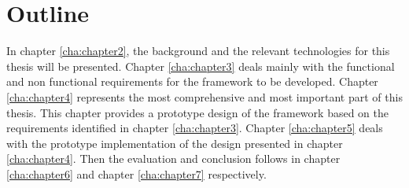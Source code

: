\section{Outline\label{sec:intro_out}}
In chapter \ref{cha:chapter2}, the background and the relevant technologies for this thesis will be presented. Chapter \ref{cha:chapter3} deals mainly with the functional and non functional requirements for the framework to be developed. Chapter \ref{cha:chapter4} represents the most comprehensive and most important part of this thesis. This chapter provides a prototype design of the framework based on the requirements identified in chapter \ref{cha:chapter3}. Chapter \ref{cha:chapter5} deals with the prototype implementation of the design presented in chapter \ref{cha:chapter4}. Then the evaluation and conclusion follows in chapter \ref{cha:chapter6} and chapter \ref{cha:chapter7} respectively.
%
%
%
%

